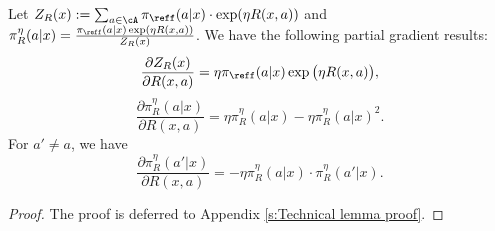 \documentclass[11pt]{article}
\begin{document}
\begin{lemma} \label{lem:computation1}
Let $Z_R(x) := \sum_{a \in \cA} \pi_{\reff}(a|x) \cdot \exp(\eta R(x, a))$ and $\pi_R^{\eta}(a|x)=\frac{\pi_{\reff}(a|x)\exp(\eta R(x,a))}{Z_R(x)}$. We have the following partial gradient results:
    \begin{equation} \label{eqn:computation1}
        \frac{\partial Z_R(x)}{\partial R(x,a)} = \eta \pi_{\reff}(a|x) \exp\big(\eta R(x,a)\big),
    \end{equation}
    \begin{equation}\label{eqn:computation2}
        \frac{\partial \pi^\eta_R(a|x)}{\partial R(x,a)} = \eta \pi_R^\eta(a|x) - \eta \pi_R^\eta(a|x)^2.
    \end{equation}
    For $a' \neq a$, we have
    \begin{equation}\label{eqn:computation3}
        \frac{\partial \pi^\eta_R(a'|x)}{\partial R(x,a)} = -\eta \pi_R^\eta(a|x) \cdot \pi_R^\eta(a'|x).
    \end{equation}
\end{lemma}
\begin{proof}
    The proof is deferred to Appendix \ref{s:Technical lemma proof}.
\end{proof}
\end{document}
